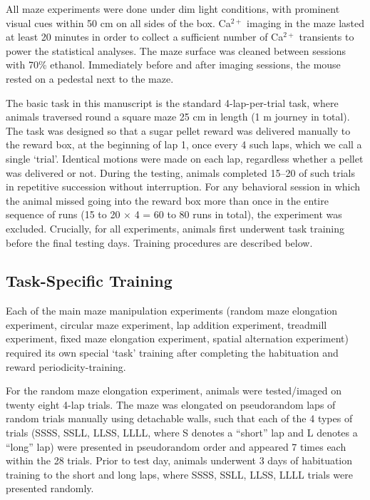 All maze experiments were done under dim light conditions, with prominent visual cues within 50 cm on all sides of the box. Ca$^{2+}$ imaging in the maze lasted at least 20 minutes in order to collect a sufficient number of Ca$^{2+}$ transients to power the statistical analyses. The maze surface was cleaned between sessions with 70\% ethanol. Immediately before and after imaging sessions, the mouse rested on a pedestal next to the maze.

The basic task in this manuscript is the standard 4-lap-per-trial task, where animals traversed round a square maze 25 cm in length (1 m journey in total). The task was designed so that a sugar pellet reward was delivered manually to the reward box, at the beginning of lap 1, once every 4 such laps, which we call a single `trial'. Identical motions were made on each lap, regardless whether a pellet was delivered or not. During the testing, animals completed 15--20 of such trials in repetitive succession without interruption. For any behavioral session in which the animal missed going into the reward box more than once in the entire sequence of runs (15 to 20 $\times$ 4 = 60 to 80 runs in total), the experiment was excluded. Crucially, for all experiments, animals first underwent task training before the final testing days. Training procedures are described below.

\subsection{Task-Specific Training}

Each of the main maze manipulation experiments (random maze elongation experiment, circular maze experiment, lap addition experiment, treadmill experiment, fixed maze elongation experiment, spatial alternation experiment) required its own special `task' training after completing the habituation and reward periodicity-training.

For the random maze elongation experiment, animals were tested/imaged on twenty eight 4-lap trials. The maze was elongated on pseudorandom laps of random trials manually using detachable walls, such that each of the 4 types of trials (SSSS, SSLL, LLSS, LLLL, where S denotes a ``short'' lap and L denotes a ``long'' lap) were presented in pseudorandom order and appeared 7 times each within the 28 trials. Prior to test day, animals underwent 3 days of habituation training to the short and long laps, where SSSS, SSLL, LLSS, LLLL trials were presented randomly.

